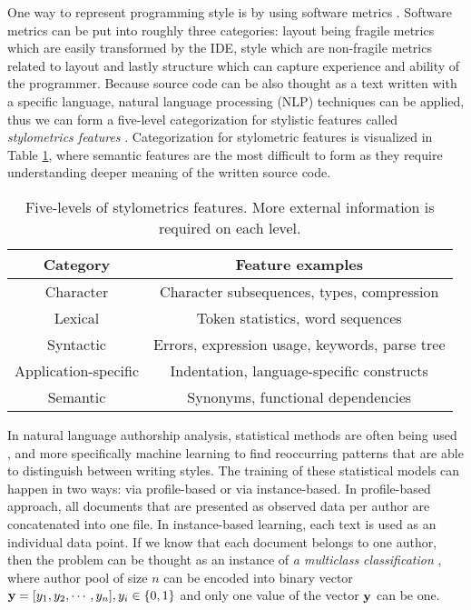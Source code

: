 One way to represent programming style is by using software metrics \cite{KRSUL1997233}. Software metrics can be put into roughly three categories: layout being fragile metrics which are easily transformed by the IDE, style which are non-fragile metrics related to layout and lastly structure which can capture experience and ability of the programmer. Because source code can be also thought as a text written with a specific language, natural language processing (NLP) techniques can be applied, thus we can form a five-level categorization for stylistic features called \emph{stylometrics features}  \cite{Stamatatos:2009:SMA:1527090.1527102}. Categorization for stylometric features is visualized in Table \ref{tbl-ai-stylomet}, where semantic features are the most difficult to form as they require understanding deeper meaning of the written source code.

\newpage

\begin{table}[ht]
\centering
\caption{Five-levels of stylometrics features. More external information is required on each level.}
\label{tbl-ai-stylomet}
\begin{tabular}{|c|c|} \hline
\textbf{Category}             & \textbf{Feature examples} \\ \hline
Character            & Character subsequences, types, compression            \\
Lexical              & Token statistics, word sequences                   \\
Syntactic            & Errors, expression usage, keywords, parse tree        \\
Application-specific & Indentation, language-specific constructs \\ 
Semantic             & Synonyms, functional dependencies                \\\hline
\end{tabular}
\end{table}

In natural language authorship analysis, statistical methods are often being used \cite{Stamatatos:2009:SMA:1527090.1527102}, and more specifically machine learning to find reoccurring patterns that are able to distinguish between writing styles. The training of these statistical models can happen in two ways: via profile-based or via instance-based. In profile-based approach, all documents that are presented as observed data per author are concatenated into one file. In instance-based learning, each text is used as an individual data point. If we know that each document belongs to one author, then the problem can be thought as an instance of \emph{a multiclass classification} \cite{Stamatatos:2009:SMA:1527090.1527102}, where author pool of size $n$ can be encoded into binary vector $\mathbf{y} = [y_1, y_2, \cdots, y_n], y_i \in \{0, 1\}$ and only one value of the vector $\mathbf{y}$ can be one.


